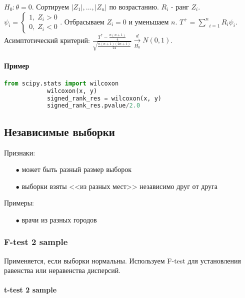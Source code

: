 		$H_0: \theta = 0$. Сортируем $|Z_1|, \dots, |Z_n|$ по возрастанию. $R_i$ - ранг $Z_i$. $\psi_i = \begin{cases}
			1, \; Z_i > 0 \\
			0, \; Z_i < 0
		\end{cases}$. Отбрасываем $Z_i = 0$ и уменьшаем $n$. $T^{+} = \underset{i=1}{\overset{n}{\sum}}R_i \psi_i$.\\

		Асимптотический критерий: $\frac{T^{*} - \frac{n(n+1)}{4}}{\sqrt{\frac{n(n+1)(2n+1)}{24}}} \xrightarrow[H_0]{d} N(0,1)$.

		\paragraph*{Пример}\label{cha:2sample/sec:mo/subsec:pair/subsubsec:wilcox/par:prob}

		\begin{lstlisting}[language=Python]
			from scipy.stats import wilcoxon
			wilcoxon(x, y)
			signed_rank_res = wilcoxon(x, y)
			signed_rank_res.pvalue/2.0
		\end{lstlisting}

\subsection{Независимые выборки}\label{cha:2sample/sec:mo/subsec:nes}

Признаки:
\begin{itemize}
	\item[$\bullet$] может быть разный размер выборок
	\item[$\bullet$] выборки взяты <<из разных мест>> независимо друг от друга
\end{itemize}
Примеры:
\begin{itemize}
	\item[$\bullet$] врачи из разных городов
\end{itemize}

	\subsubsection{F-test 2 sample}\label{cha:2sample/sec:mo/subsec:pair/subsubsec:ftest}

	Применяется, если выборки нормальны. Используем F-test для установления равенства или неравенства дисперсий.

		\paragraph{t-test 2 sample}\label{cha:2sample/sec:mo/subsec:pair/subsubsec:ftest/par:ttest}

